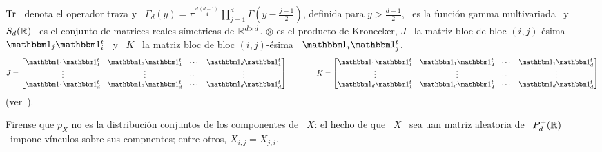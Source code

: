 %
$\operatorname{Tr}$ \ denota  el operador traza y \ $\Gamma_d(y)  = \pi^{\frac{d \, (d-1)}{4}}
\prod_{j=1}^d  \Gamma\left(  y -  \frac{j-1}{2}  \right)$,  definida  para $y  >
\frac{d-1}{2}$, \ es la  funci\'on gamma multivariada~\cite{And03, GupNag99} y \
$S_d(\mathbb{R})$  \ es  el conjunto  de  matrices reales  s\'imetricas de  $\mathbb{R}^{d
  \times d}$.   $\otimes$ es el producto de  Kronecker, $J$ \ la  matriz bloc de
bloc $(i,j)$-\'esima  \ $\un_j \un_i^t$ \ y \ $K$ \
la matriz bloc de bloc  $(i,j)$-\'esima \ $\un_i \un_j^t$,
%
\[
J = \begin{bmatrix}
\un_1 \un_1^t & \un_2 \un_1^t & \cdots & \un_d \un_1^t\\
    \vdots    &    \vdots    & \cdots &     \vdots   \\
\un_1 \un_d^t & \un_2 \un_d^t & \cdots & \un_d \un_d^t
\end{bmatrix}
%
\qquad\qquad
%
K = \begin{bmatrix}
\un_1 \un_1^t & \un_1 \un_2^t & \cdots & \un_1 \un_d^t\\
    \vdots    &    \vdots    & \cdots &     \vdots   \\
\un_d \un_1^t & \un_d \un_2^t & \cdots & \un_d \un_d^t
\end{bmatrix}
\]
%
(ver~\cite{PedRic91, SulTra96, And03}).

Firense que $p_X$ no es la distribuci\'on conjuntos de los componentes de \ $X$:
el hecho de  que \ $X$ \ sea  uan matriz aleatoria de \  $P_d^+(\mathbb{R})$ \ impone
v\'inculos sobre sus compnentes; entre otros, $X_{i,j} = X_{j,i}$.


